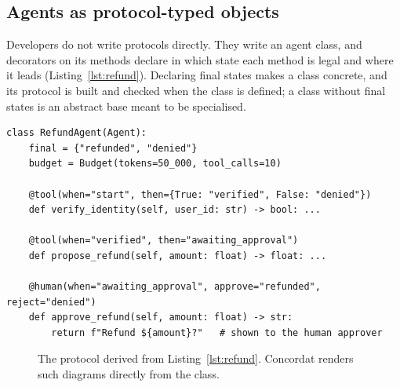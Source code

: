 \documentclass[11pt]{article}
\begin{document}
\subsection{Agents as protocol-typed objects}

Developers do not write protocols directly. They write an agent class, and decorators
on its methods declare in which state each method is legal and where it leads
(Listing~\ref{lst:refund}). Declaring final states makes a class concrete, and its
protocol is built and checked when the class is defined; a class without final states is
an abstract base meant to be specialised.

\begin{lstlisting}[caption={A refund agent. The protocol is built from the decorators.},label={lst:refund},float=t]
class RefundAgent(Agent):
    final = {"refunded", "denied"}
    budget = Budget(tokens=50_000, tool_calls=10)

    @tool(when="start", then={True: "verified", False: "denied"})
    def verify_identity(self, user_id: str) -> bool: ...

    @tool(when="verified", then="awaiting_approval")
    def propose_refund(self, amount: float) -> float: ...

    @human(when="awaiting_approval", approve="refunded", reject="denied")
    def approve_refund(self, amount: float) -> str:
        return f"Refund ${amount}?"   # shown to the human approver
\end{lstlisting}

\begin{figure}[t]
\centering
{}
\caption{The protocol derived from Listing~\ref{lst:refund}. Concordat renders such
diagrams directly from the class.}
\label{fig:refund}
\end{figure}
\end{document}
